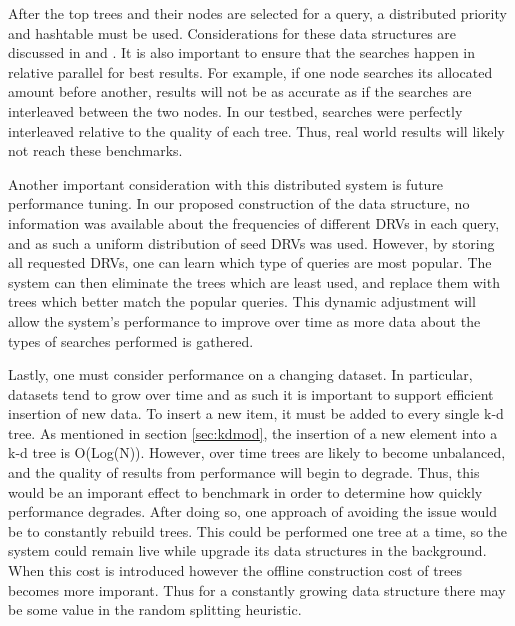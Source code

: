 After the top trees and their nodes are selected for a query, a distributed priority and hashtable must be used.  Considerations for these data structures are discussed in \citep{kaashoek2003koorde} and \citep{rogers1995supporting}.  It is also important to ensure that the searches happen in relative parallel for best results.  For example, if one node searches its allocated amount before another, results will not be as accurate as if the searches are interleaved between the two nodes.  In our testbed, searches were perfectly interleaved relative to the quality of each tree.  Thus, real world results will likely not reach these benchmarks.

Another important consideration with this distributed system is future performance tuning.  In our proposed construction of the data structure, no information was available about the frequencies of different DRVs in each query, and as such a uniform distribution of seed DRVs was used.  However, by storing all requested DRVs, one can learn which type of queries are most popular.  The system can then eliminate the trees which are least used, and replace them with trees which better match the popular queries.  This dynamic adjustment will allow the system's performance to improve over time as more data about the types of searches performed is gathered.

Lastly, one must consider performance on a changing dataset.  In particular, datasets tend to grow over time and as such it is important to support efficient insertion of new data.  To insert a new item, it must be added to every single k-d tree.  As mentioned in section \ref{sec:kdmod}, the insertion of a new element into a k-d tree is O(Log(N)).  However, over time trees are likely to become unbalanced, and the quality of results from performance will begin to degrade.  Thus, this would be an imporant effect to benchmark in order to determine how quickly performance degrades.  After doing so, one approach of avoiding the issue would be to constantly rebuild trees.  This could be performed one tree at a time, so the system could remain live while upgrade its data structures in the background.  When this cost is introduced however the offline construction cost of trees becomes more imporant.  Thus for a constantly growing data structure there may be some value in the random splitting heuristic.